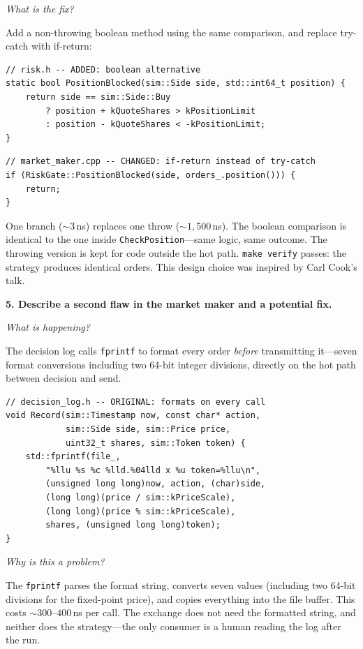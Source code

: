 \documentclass[11pt]{article}
\newcommand{\prompt}[1]{\par\medskip\noindent\textbf{#1}\par\smallskip\noindent\ignorespaces}
\newcommand{\sq}[1]{\par\smallskip\noindent\textit{#1}\par\noindent\ignorespaces}
\begin{document}
\sq{What is the fix?}
Add a non-throwing boolean method using the same comparison, and replace try-catch with if-return:

\begin{lstlisting}
// risk.h -- ADDED: boolean alternative
static bool PositionBlocked(sim::Side side, std::int64_t position) {
    return side == sim::Side::Buy
        ? position + kQuoteShares > kPositionLimit
        : position - kQuoteShares < -kPositionLimit;
}
\end{lstlisting}

\begin{lstlisting}
// market_maker.cpp -- CHANGED: if-return instead of try-catch
if (RiskGate::PositionBlocked(side, orders_.position())) {
    return;
}
\end{lstlisting}

One branch (${\sim}3$\,ns) replaces one throw (${\sim}1{,}500$\,ns). The boolean comparison is identical to the one inside \texttt{CheckPosition}---same logic, same outcome. The throwing version is kept for code outside the hot path. \texttt{make verify} passes: the strategy produces identical orders. This design choice was inspired by Carl Cook's talk.



\prompt{5. Describe a second flaw in the market maker and a potential fix.}

\sq{What is happening?}
The decision log calls \texttt{fprintf} to format every order \emph{before} transmitting it---seven format conversions including two 64-bit integer divisions, directly on the hot path between decision and send.

\begin{lstlisting}
// decision_log.h -- ORIGINAL: formats on every call
void Record(sim::Timestamp now, const char* action,
            sim::Side side, sim::Price price,
            uint32_t shares, sim::Token token) {
    std::fprintf(file_,
        "%llu %s %c %lld.%04lld x %u token=%llu\n",
        (unsigned long long)now, action, (char)side,
        (long long)(price / sim::kPriceScale),
        (long long)(price % sim::kPriceScale),
        shares, (unsigned long long)token);
}
\end{lstlisting}

\sq{Why is this a problem?}
The \texttt{fprintf} parses the format string, converts seven values (including two 64-bit divisions for the fixed-point price), and copies everything into the file buffer. This costs ${\sim}300$--$400$\,ns per call. The exchange does not need the formatted string, and neither does the strategy---the only consumer is a human reading the log after the run.
\end{document}
